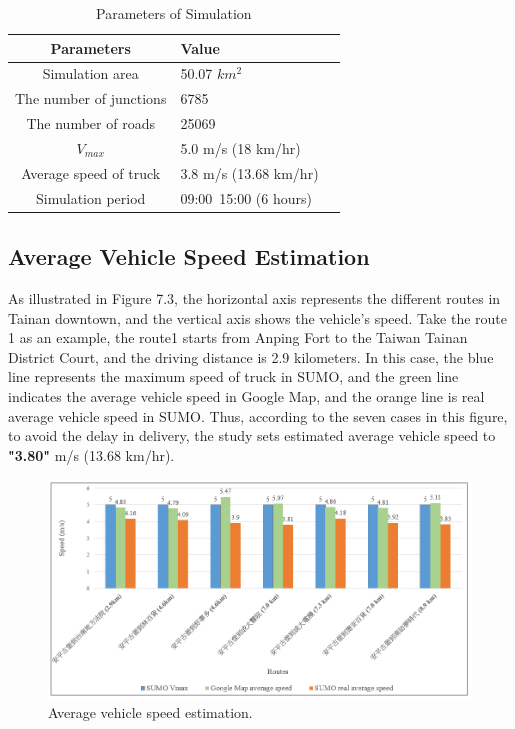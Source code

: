 \documentclass[12pt]{ksthesis}
\begin{document}
\begin{thesis}
{%

\begin{table}
\large
\centering
\caption{Parameters of Simulation}
\begin{tabular}{|c|l|r|} %
\hline 
\textbf{Parameters}&\textbf{Value}\\ 
\hline  
Simulation area & 50.07 $km^{2}$ \\
\hline
The number of junctions & 6785\\
\hline 
The number of roads & 25069\\
\hline 
$V_{max}$& 5.0 m/s (18 km/hr) \\
\hline 
Average speed of truck & 3.8 m/s (13.68 km/hr)\\
\hline 
Simulation period & 09:00~15:00 (6 hours)\\

\hline
 
\end{tabular}

\end{table}

\subsection{Average Vehicle Speed Estimation}

As illustrated in Figure 7.3, the horizontal axis represents the different routes in Tainan downtown, and the vertical axis shows the vehicle's speed. Take the route 1 as an example, the route1 starts from Anping Fort to the Taiwan Tainan District Court, and the driving distance is 2.9 kilometers. In this case, the blue line represents the maximum speed of truck in SUMO, and the green line indicates the average vehicle speed in Google Map, and the orange line is real average vehicle speed in SUMO. Thus, according to the seven cases in this figure, to avoid the delay in delivery, the study sets estimated average vehicle speed to \textbf{"3.80"} m/s (13.68 km/hr).


\begin{figure}[t]
\centering
\includegraphics[width=1.0\textwidth]{./Thesis_figures/F7-3_speedEstimation.PNG}
\caption{\large Average vehicle speed estimation.}
\vspace{0.5cm}
\label{Fig:Average_vehicleSpeedEstimation}
\end{figure}

}
\end{thesis}
\end{document}
